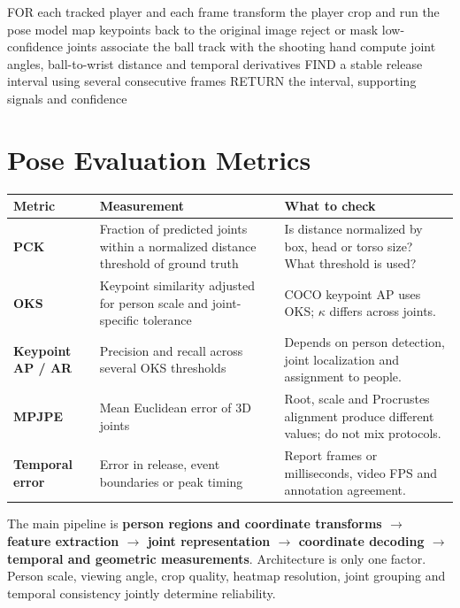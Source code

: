 \documentclass[11pt,a4paper,oneside]{report}
\begin{document}
\begin{pseudoBox}
FOR each tracked player and each frame
  transform the player crop and run the pose model
  map keypoints back to the original image
  reject or mask low-confidence joints
  associate the ball track with the shooting hand
  compute joint angles, ball-to-wrist distance and temporal derivatives
FIND a stable release interval using several consecutive frames
RETURN the interval, supporting signals and confidence
\end{pseudoBox}

\section{Pose Evaluation Metrics}

\begin{tabularx}{\textwidth}{>{\bfseries\RaggedRight}p{3.0cm} Y Y}
\toprule
Metric & Measurement & What to check \\
\midrule
PCK & Fraction of predicted joints within a normalized distance threshold of ground truth & Is distance normalized by box, head or torso size? What threshold is used?\\
OKS & Keypoint similarity adjusted for person scale and joint-specific tolerance & COCO keypoint AP uses OKS; $\kappa$ differs across joints.\\
Keypoint AP / AR & Precision and recall across several OKS thresholds & Depends on person detection, joint localization and assignment to people.\\
MPJPE & Mean Euclidean error of 3D joints & Root, scale and Procrustes alignment produce different values; do not mix protocols.\\
Temporal error & Error in release, event boundaries or peak timing & Report frames or milliseconds, video FPS and annotation agreement.\\
\bottomrule
\end{tabularx}

\begin{takeawayBox}
The main pipeline is \textbf{person regions and coordinate transforms $\rightarrow$ feature extraction $\rightarrow$ joint representation $\rightarrow$ coordinate decoding $\rightarrow$ temporal and geometric measurements}. Architecture is only one factor. Person scale, viewing angle, crop quality, heatmap resolution, joint grouping and temporal consistency jointly determine reliability.
\end{takeawayBox}


\end{document}
